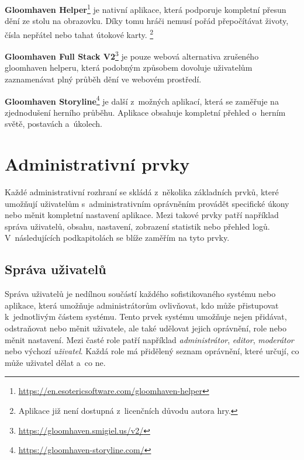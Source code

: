 \begin{description}
    \item \textbf{Gloomhaven Helper}\footnote{\href{https://en.esotericsoftware.com/gloomhaven-helper}{https://en.esotericsoftware.com/gloomhaven-helper}} je nativní aplikace, která podporuje kompletní přesun dění ze stolu na obrazovku. Díky tomu hráči nemusí pořád přepočítávat životy, čísla nepřátel nebo tahat útokové karty. \footnote{Aplikace již není dostupná z~licenčních důvodu autora hry.}
    \item \textbf{Gloomhaven Full Stack V2}\footnote{\href{https://gloomhaven.smigiel.us/v2/}{https://gloomhaven.smigiel.us/v2/}} je pouze webová alternativa zrušeného gloomhaven helperu, která podobným způsobem dovoluje uživatelům zaznamenávat plný průběh dění ve webovém prostředí.
    \item \textbf{Gloomhaven Storyline}\footnote{\href{https://gloomhaven-storyline.com/}{https://gloomhaven-storyline.com/}} je další z~možných aplikací, která se zaměřuje na zjednodušení herního průběhu. Aplikace obsahuje kompletní přehled o~herním světě, postavách a~úkolech.
\end{description}

\section{Administrativní prvky}
\label{sec:admin-elements}
Každé administrativní rozhraní se skládá z~několika základních prvků, které umožňují uživatelům s~administrativním oprávněním provádět specifické úkony nebo měnit kompletní nastavení aplikace. Mezi takové prvky patří například správa uživatelů, obsahu, nastavení, zobrazení statistik nebo přehled logů. V~následujících podkapitolách se blíže zaměřím na tyto prvky.

\subsection{Správa uživatelů}
\label{subsec:admin-elements-user-management}
Správa uživatelů je nedílnou součástí každého sofistikovaného systému nebo aplikace, která umožňuje administrátorům ovlivňovat, kdo může přistupovat k~jednotlivým částem systému. Tento prvek systému umožňuje nejen přidávat, odstraňovat nebo měnit uživatele, ale také udělovat jejich oprávnění, role nebo měnit nastavení. Mezi časté role patří například \textit{administrátor}, \textit{editor}, \textit{moderátor} nebo výchozí \textit{uživatel}. Každá role má přidělený seznam oprávnění, které určují, co může uživatel dělat a~co ne.

